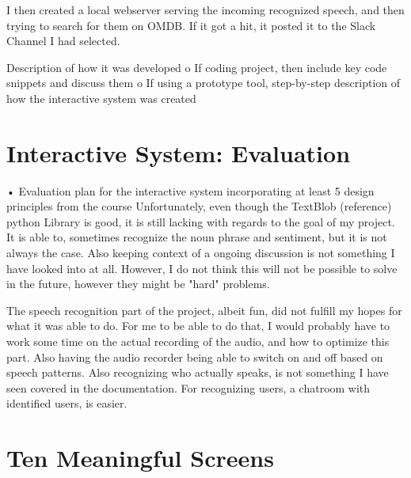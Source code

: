 \documentclass[11pt,fleqn]{book} %
\begin{document}
I then created a local webserver serving the incoming recognized speech, and then trying to search for them on OMDB. If it got a hit, it posted it to the Slack Channel I had selected.

Description of how it was developed
o	If coding project, then include key code snippets and discuss them
o	If using a prototype tool, step-by-step description of how the interactive system was created




\chapter{Interactive System: Evaluation}
•	Evaluation plan for the interactive system incorporating at least 5 design principles from the course
Unfortunately, even though the TextBlob (reference) python Library is good, it is still lacking with regards to the goal of my project.
It is able to, sometimes recognize the noun phrase and sentiment, but it is not always the case.
Also keeping context of a ongoing discussion is not something I have looked into at all.
However, I do not think this will not be possible to solve in the future, however they might be "hard" problems.

The speech recognition part of the project, albeit fun, did not fulfill my hopes for what it was able to do. For me to be able to do that, I would probably have to work some time on the actual recording of the audio, and how to optimize this part. Also having the audio recorder being able to switch on and off based on speech patterns.
Also recognizing who actually speaks, is not something I have seen covered in the documentation.
For recognizing users, a chatroom with identified users, is easier.


\chapter{Ten Meaningful Screens}
\end{document}
